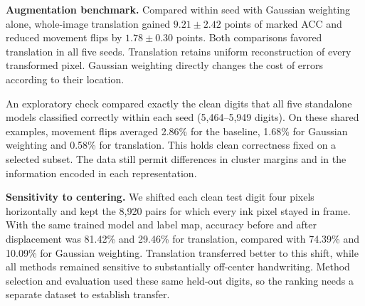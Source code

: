 \textbf{Augmentation benchmark.} Compared within seed with Gaussian weighting alone, whole-image translation gained $9.21\pm2.42$ points of marked ACC and reduced movement flips by $1.78\pm0.30$ points. Both comparisons favored translation in all five seeds. Translation retains uniform reconstruction of every transformed pixel. Gaussian weighting directly changes the cost of errors according to their location.

An exploratory check compared exactly the clean digits that all five standalone models classified correctly within each seed (5,464--5,949 digits). On these shared examples, movement flips averaged 2.86\% for the baseline, 1.68\% for Gaussian weighting and 0.58\% for translation. This holds clean correctness fixed on a selected subset. The data still permit differences in cluster margins and in the information encoded in each representation.

\textbf{Sensitivity to centering.} We shifted each clean test digit four pixels horizontally and kept the 8,920 pairs for which every ink pixel stayed in frame. With the same trained model and label map, accuracy before and after displacement was 81.42\% and 29.46\% for translation, compared with 74.39\% and 10.09\% for Gaussian weighting. Translation transferred better to this shift, while all methods remained sensitive to substantially off-center handwriting. Method selection and evaluation used these same held-out digits, so the ranking needs a separate dataset to establish transfer.
